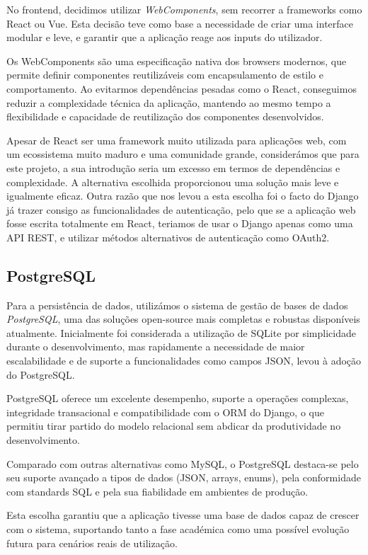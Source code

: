 No frontend, decidimos utilizar \textit{WebComponents}, sem recorrer a frameworks como React ou Vue. Esta decisão teve como base a necessidade de criar uma interface modular e leve, e garantir que a aplicação reage aos inputs do utilizador.

Os WebComponents são uma especificação nativa dos browsers modernos, que permite definir componentes reutilizáveis com encapsulamento de estilo e comportamento. Ao evitarmos dependências pesadas como o React, conseguimos reduzir a complexidade técnica da aplicação, mantendo ao mesmo tempo a flexibilidade e capacidade de reutilização dos componentes desenvolvidos.

Apesar de React ser uma framework muito utilizada para aplicações web,  com um ecossistema muito maduro e uma comunidade grande, considerámos que para este projeto, a sua introdução seria um excesso em termos de dependências e complexidade. A alternativa escolhida proporcionou uma solução mais leve e igualmente eficaz. Outra razão que nos levou a esta escolha foi o facto do Django já trazer consigo as funcionalidades de autenticação, pelo que se a aplicação web fosse escrita totalmente em React, teriamos de usar o Django apenas como uma API REST, e utilizar métodos alternativos de autenticação como OAuth2.

\subsection{PostgreSQL}

Para a persistência de dados, utilizámos o sistema de gestão de bases de dados \textit{PostgreSQL}, uma das soluções open-source mais completas e robustas disponíveis atualmente. Inicialmente foi considerada a utilização de SQLite por simplicidade durante o desenvolvimento, mas rapidamente a necessidade de maior escalabilidade e de suporte a funcionalidades como campos JSON, levou à adoção do PostgreSQL.

PostgreSQL oferece um excelente desempenho, suporte a operações complexas, integridade transacional e compatibilidade com o ORM do Django, o que permitiu tirar partido do modelo relacional sem abdicar da produtividade no desenvolvimento.

Comparado com outras alternativas como MySQL, o PostgreSQL destaca-se pelo seu suporte avançado a tipos de dados (\gls{JSON}, arrays, enums), pela conformidade com standards SQL e pela sua fiabilidade em ambientes de produção.

Esta escolha garantiu que a aplicação tivesse uma base de dados capaz de crescer com o sistema, suportando tanto a fase académica como uma possível evolução futura para cenários reais de utilização.

